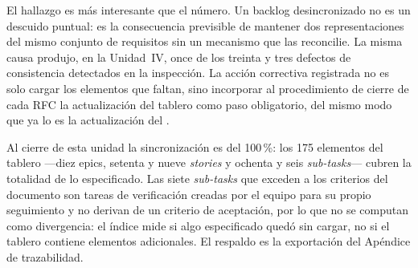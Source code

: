 El hallazgo es más interesante que el número. Un backlog desincronizado no es un descuido puntual:
es la consecuencia previsible de mantener dos representaciones del mismo conjunto de requisitos sin
un mecanismo que las reconcilie. La misma causa produjo, en la Unidad~IV, once de los treinta y tres
defectos de consistencia detectados en la inspección. La acción correctiva registrada no es solo
cargar los elementos que faltan, sino incorporar al procedimiento de cierre de cada RFC la
actualización del tablero como paso obligatorio, del mismo modo que ya lo es la actualización del
.

Al cierre de esta unidad la sincronización es del 100\,\%: los 175 elementos del tablero ---diez
epics, setenta y nueve \emph{stories} y ochenta y seis \emph{sub-tasks}--- cubren la totalidad de lo
especificado. Las siete \emph{sub-tasks} que exceden a los criterios del documento son tareas de
verificación creadas por el equipo para su propio seguimiento y no derivan de un criterio de
aceptación, por lo que no se computan como divergencia: el índice mide si algo especificado quedó
sin cargar, no si el tablero contiene elementos adicionales. El respaldo es la exportación
 del Apéndice de trazabilidad.
